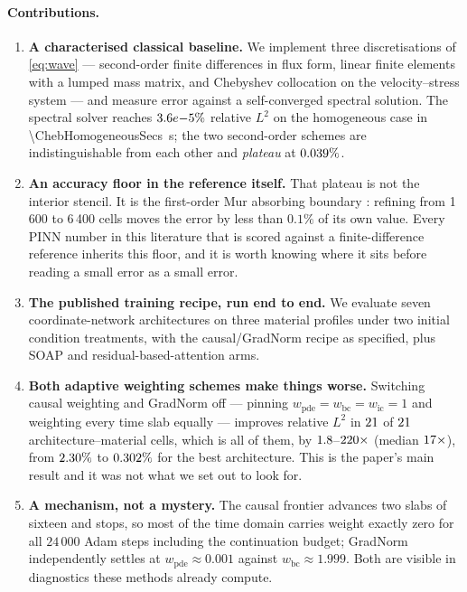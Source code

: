 \paragraph{Contributions.}
\begin{enumerate}\itemsep2pt
\item \textbf{A characterised classical baseline.} We implement three
  discretisations of \eqref{eq:wave} --- second-order finite differences in
  flux form, linear finite elements with a lumped mass matrix, and Chebyshev
  collocation on the velocity--stress system --- and measure error against a
  self-converged spectral solution. The spectral solver reaches
  $3.6e{-}5\%$ relative $L^2$ on the homogeneous case in
  \SI{\ChebHomogeneousSecs}{\second}; the two second-order schemes are
  indistinguishable from each other and \emph{plateau} at $0.039\%$.
\item \textbf{An accuracy floor in the reference itself.} That plateau is not
  the interior stencil. It is the first-order Mur absorbing boundary
  \citep{mur1981abc}: refining from 1\,600 to 6\,400 cells moves the error by
  less than $0.1\%$ of its own value. Every PINN number in this literature that
  is scored against a finite-difference reference inherits this floor, and it
  is worth knowing where it sits before reading a small error as a small error.
\item \textbf{The published training recipe, run end to end.} We evaluate seven
  coordinate-network architectures on three material profiles under two initial
  condition treatments, with the causal/GradNorm recipe as specified, plus
  SOAP and residual-based-attention arms.
\item \textbf{Both adaptive weighting schemes make things worse.} Switching
  causal weighting and GradNorm off --- pinning
  $w_{\mathrm{pde}} = w_{\mathrm{bc}} = w_{\mathrm{ic}} = 1$ and weighting every
  time slab equally --- improves relative $L^2$ in
  $21$ of $21$ architecture--material cells, which is all of
  them, by $1.8$--$220\times$ (median $17\times$),
  from $2.30\%$ to $0.302\%$ for the best architecture.
  This is the paper's main result and it was not what we set out to look for.
\item \textbf{A mechanism, not a mystery.} The causal frontier advances two
  slabs of sixteen and stops, so most of the time domain carries weight exactly
  zero for all $24\,000$ Adam steps including the continuation budget; GradNorm
  independently settles at $w_{\mathrm{pde}} \approx 0.001$ against
  $w_{\mathrm{bc}} \approx 1.999$. Both are visible in diagnostics these methods
  already compute.
\end{enumerate}

